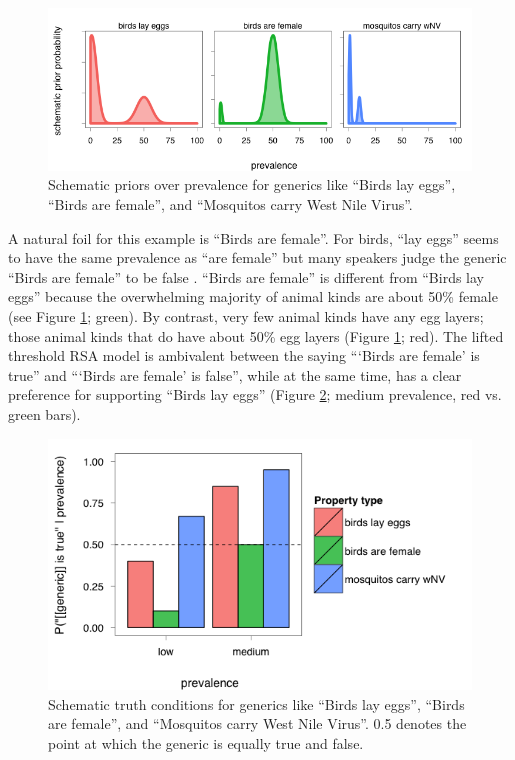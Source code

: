 \documentclass[10pt,letterpaper]{article}
\begin{document}
\begin{figure}[t]
  \begin{center}
    \includegraphics[width=0.8\columnwidth]{schematicPriors}
  \end{center}
  \caption{Schematic priors over prevalence for generics like ``Birds lay eggs'', ``Birds are female'', and ``Mosquitos carry West Nile Virus''.}
   \label{fig:schematic}
\end{figure}

A natural foil for this example is ``Birds are female''. For birds, ``lay eggs'' seems to have the same prevalence as ``are female'' but many speakers judge the generic ``Birds are female'' to be false \cite{Khemlani2009, Brandone2012}.  ``Birds are female'' is different from ``Birds lay eggs'' because the overwhelming majority of animal kinds are about 50\% female (see Figure \ref{fig:schematic}; green). By contrast, very few animal kinds have any egg layers; those animal kinds that do have about 50\% egg layers (Figure \ref{fig:schematic}; red). The lifted threshold RSA model is ambivalent between the saying ```Birds are female' is true'' and ```Birds are female' is false'', while at the same time, has a clear preference for supporting ``Birds lay eggs'' (Figure \ref{fig:schem_tc}; medium prevalence, red vs. green bars).

\begin{figure}
  \begin{center}
    \includegraphics[width=0.8\columnwidth]{schematic_tc_bars}
  \end{center}
  \caption{Schematic truth conditions for generics like ``Birds lay eggs'', ``Birds are female'', and ``Mosquitos carry West Nile Virus''. 0.5 denotes the point at which the generic is equally true and false.}
   \label{fig:schem_tc}
\end{figure}
\end{document}
